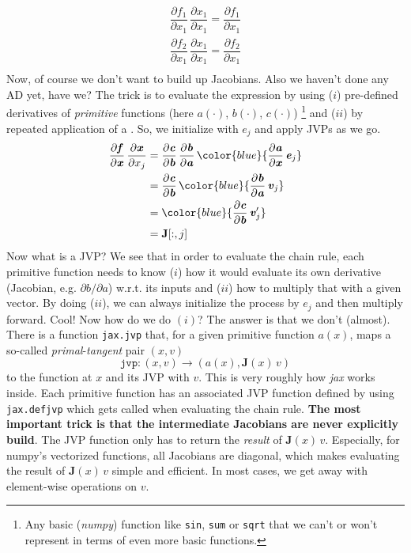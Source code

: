 \documentclass[paper=a4,11pt,headsepline]{scrartcl}
\newcommand{\ve}[1]{\ensuremath{\bm{\mathit{#1}}}}
\newcommand{\ma}[1]{\ensuremath{\bm{\mathbf{#1}}}}
\newcommand{\ra}{\ensuremath{\rightarrow}}
\newcommand{\pd}[2]{\dfrac{\partial #1}{\partial #2}}
\newcommand{\pdi}[2]{\partial #1/\partial #2}
\newcommand{\blue}[1]{{\color{blue}{#1}}}
\newcommand{\soft}[1]{\textsl{#1}\xspace}
\newcommand{\numpy}{\soft{numpy}}
\newcommand{\jax}{\soft{jax}}
\newcommand{\co}[1]{\texttt{#1}}
\begin{document}
\begin{gather*}
    \pd{f_1}{x_1}\,\pd{x_1}{x_1} = \pd{f_1}{x_1} \\
    \pd{f_2}{x_1}\,\pd{x_1}{x_1} = \pd{f_2}{x_1} \\
\end{gather*}
Now, of course we don't want to build up Jacobians. Also we haven't done any AD
yet, have we? The trick is to evaluate the expression by using ($i$)
pre-defined derivatives of \emph{primitive} functions (here $\ve a(\cdot)$,
$\ve b(\cdot)$, $\ve c(\cdot)$)%
\footnote{Any basic (\numpy) function like \co{sin}, \co{sum}
or \co{sqrt} that we can't or won't represent in terms of even more basic
functions.}
and ($ii$) by repeated application of a
\blue{\emph{Jacobian vector product (JVP)}}. So, we initialize with $\ve e_j$
and apply JVPs as we go.
\begin{align*}
    \pd{\ve f}{\ve x}\,\pd{\ve x}{x_j}
        &= \pd{\ve c}{\ve b}\,\pd{\ve b}{\ve a}\,\blue{\pd{\ve a}{\ve x}\,\ve e_j} \\
        &= \pd{\ve c}{\ve b}\,\blue{\pd{\ve b}{\ve a}\,\ve v_j} \\
        &= \blue{\pd{\ve c}{\ve b}\,\ve v_j'} \\
        &= \ma J[:,j]
\end{align*}
Now what is a JVP? We see that in order to evaluate the chain rule, each
primitive function
needs to know ($i$) how it would evaluate its own derivative (Jacobian, e.g.
$\pdi{\ve b}{\ve a}$) w.r.t. its inputs and ($ii$) how to multiply that with a
given vector. By doing ($ii$), we can always initialize the process by $\ve
e_j$ and then multiply forward. Cool! Now how do we do $(i)$? The answer is
that we don't (almost). There is a function \co{jax.jvp} that, for a given
primitive function $\ve a(\ve x)$, maps a so-called
\emph{primal}-\emph{tangent} pair $(\ve x, \ve v)$
\begin{equation*}
    \co{jvp}: (\ve x, \ve v) \ra \left(\ve a(\ve x), \ma J(\ve x)\,\ve v\right)
\end{equation*}
to the function at $\ve x$ and its JVP with $\ve v$. This is very roughly how
\jax works inside. Each primitive function has an associated
JVP function defined by using \co{jax.defjvp} which gets called when evaluating
the chain rule. \textbf{The most important trick is that the intermediate
Jacobians are never explicitly build}. The JVP function only has to return the
\emph{result} of $\ma J(\ve x)\,\ve v$. Especially, for numpy's vectorized
functions, all Jacobians are diagonal, which makes evaluating the result of $\ma J(\ve x)\,\ve v$
simple and efficient. In most cases, we get away with element-wise operations
on \ve v.
\end{document}
